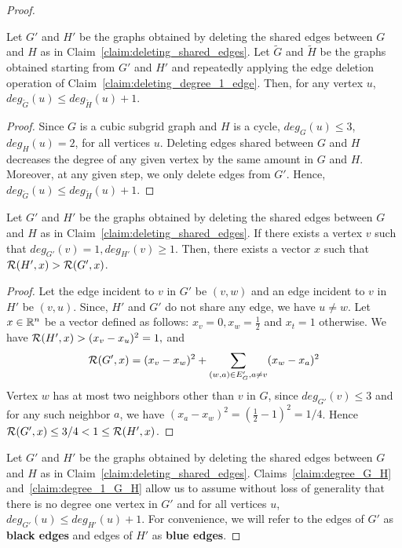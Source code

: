 \begin{proof}
\begin{claim}\label{claim:degree_G_H}
Let $G'$ and $H'$ be the graphs obtained by deleting the shared edges between $G$ and $H$ as in
Claim~\ref{claim:deleting_shared_edges}.
Let $\tilde{G}$ and $\tilde{H}$ be the graphs obtained starting from $G'$ and $H'$ and repeatedly
applying the edge deletion operation of Claim~\ref{claim:deleting_degree_1_edge}. Then, for any vertex $u$, $deg_{\tilde{G}}(u) \leq deg_{\tilde{H}}(u) + 1$.  
\end{claim}
\begin{proof}
Since $G$ is a cubic subgrid graph and $H$ is a cycle, $ deg_G(u) \leq 3$, $deg_H(u) = 2$, for all vertices $u$. Deleting edges shared between $G$ and $H$ decreases the degree of any given vertex by the same amount in $G$ and $H$. Moreover, at any given step, we only delete edges from $G'$. Hence, $deg_{\tilde{G}}(u) \leq deg_{\tilde{H}}(u) + 1$. 
\end{proof}

\begin{claim}\label{claim:degree_1_G_H} 
Let $G'$ and $H'$ be the graphs obtained by deleting the shared edges between $G$ and $H$ as in
Claim~\ref{claim:deleting_shared_edges}. If there exists a vertex $v$ such that $deg_{G'}(v) = 1, deg_{H'}(v) \geq 1$. Then, there exists a vector $x$ such that ${\cal R}(H',x) > {\cal R}(G',x)$.
\end{claim}
\begin{proof} Let the edge incident to $v$ in $G'$ be $(v,w)$ and an edge incident to $v$ in $H'$ be $(v,u)$. Since, $H'$ and $G'$ do not share any edge, we have $u \neq w$. Let $x \in \mathbb{R}^n$ be a vector defined as follows: $x_v = 0, x_w = \frac{1}{2}$ and  $x_t = 1$ otherwise. We have $
{\cal R}(H',x) > (x_v-x_u)^2 = 1,
$
and
\begin{equation*}
{\cal R}(G',x) = (x_v - x_w)^2 + \sum_{(w,a) \in E_G', a \neq v} (x_w-x_a)^2
\end{equation*}
Vertex $w$ has at most two neighbors other than $v$  in $G$, since $deg_{G'}(v) \leq 3$ and for any such neighbor $a$, we have $(x_a-x_w)^2 = (\frac{1}{2}-1)^2 = 1/4$. Hence ${\cal R}(G',x) \leq 3/4 <1 \leq {\cal R}(H',x)$.
\end{proof}

Let $G'$ and $H'$ be the graphs obtained by deleting the shared edges between $G$ and $H$ as in
Claim~\ref{claim:deleting_shared_edges}. Claims~\ref{claim:degree_G_H} and~\ref{claim:degree_1_G_H}
allow us to assume without loss of generality that there is no degree one vertex in $G'$ and for all vertices $u$, $deg_{G'}(u) \leq deg_{H'}(u) + 1$. For 
convenience, we will refer to the edges of $G'$ as \textbf{black edges} and edges of $H'$ as \textbf{blue edges}.


\end{proof}
